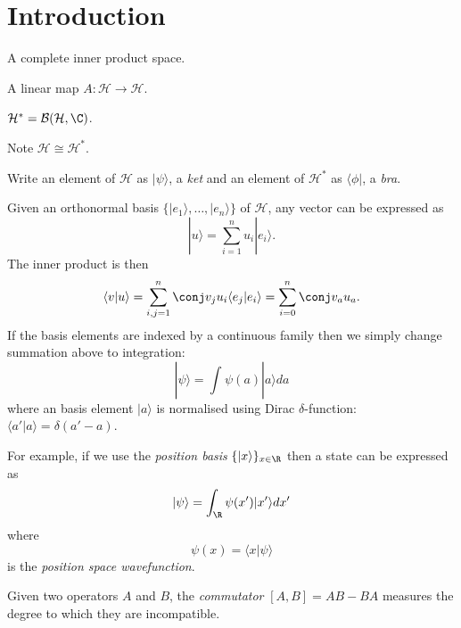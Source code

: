 \documentclass[a4paper]{article}
\renewcommand*{\H}{\mathcal{H}}
\theoremstyle{definition}
\begin{document}
\maketitle

\section{Introduction}

\begin{defi}
  A complete inner product space.
\end{defi}

\begin{defi}
  A linear map \(A: \H\to \H\).
\end{defi}

\begin{defi}
  \(\H^* = \mathcal{B}(\H,\C)\).
\end{defi}

Note \(\H \cong \H^*\).

\begin{notation}
  Write an element of \(\H\) as \(|\psi\rangle\), a \emph{ket} and an element of \(\H^*\) as \(\langle \phi|\), a \emph{bra}.
\end{notation}

Given an orthonormal basis \(\{|e_1\rangle,\dots,|e_n\rangle\}\) of \(\H\), any vector can be expressed as
\[
  |u\rangle = \sum_{i=1}^{n}u_i|e_i\rangle.
\]
The inner product is then
\[
  \langle v| u\rangle = \sum_{i,j=1}^{n}\conj v_j u_i \langle e_j|e_i\rangle = \sum_{i=0}^{n}\conj v_a u_a.
\]
If the basis elements are indexed by a continuous family then we simply change summation above to integration:
\[
  |\psi\rangle = \int_{ }^{ } \psi(a) |a\rangle da 
\]
where an basis element \(|a\rangle\) is normalised using Dirac \(\delta\)-function: \(\langle a'|a\rangle = \delta(a'-a)\).

For example, if we use the \emph{position basis} \(\{|x\rangle\}_{x\in\R}\) then a state can be expressed as
\[
  |\psi\rangle = \int_{\R}^{ } \psi(x')|x'\rangle dx'
\]
where
\[
  \psi(x) = \langle x| \psi\rangle 
\]
is the \emph{position space wavefunction}.

\begin{defi}[Commutator]
  Given two operators \(A\) and \(B\), the \emph{commutator} \([A,B] = AB- BA\) measures the degree to which they are incompatible.
\end{defi}
\end{document}

